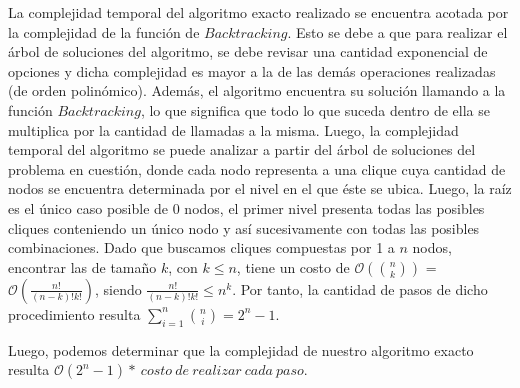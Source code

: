 La complejidad temporal del algoritmo exacto realizado se encuentra acotada por la complejidad de la función de $Backtracking$. Esto se debe a que para realizar el árbol de soluciones del algoritmo, se debe revisar una cantidad exponencial de opciones y dicha complejidad es mayor a la de las demás operaciones realizadas (de orden polinómico). Además, el algoritmo encuentra su solución llamando a la función $Backtracking$, lo que significa que todo lo que suceda dentro de ella se multiplica por la cantidad de llamadas a la misma. Luego, la complejidad temporal del algoritmo se puede analizar a partir del árbol de soluciones del problema en cuestión, donde cada nodo representa a una clique cuya cantidad de nodos se encuentra determinada por el nivel en el que éste se ubica. Luego, la raíz es el único caso posible de 0 nodos, el primer nivel presenta todas las posibles cliques conteniendo un único nodo y así sucesivamente con todas las posibles combinaciones. Dado que buscamos cliques compuestas por 1 a $n$ nodos, encontrar las de tamaño $k$, con $k\leq n$, tiene un costo de $\mathcal{O}({n \choose k})$ = $\mathcal{O}(\frac{n!}{(n-k)!k!})$, siendo $\frac{n!}{(n-k)!k!} \leq n^k$. Por tanto, la cantidad de pasos de dicho procedimiento resulta $\sum\limits_{i=1}^n {n \choose i} = 2^n - 1$. 

Luego, podemos determinar que la complejidad de nuestro algoritmo exacto resulta $\mathcal{O}(2^n - 1) * \ costo\ de\ realizar\ cada\ paso$.

